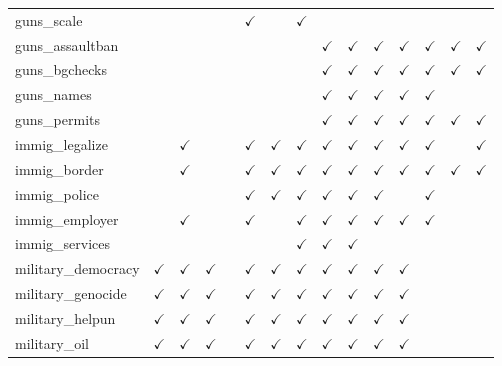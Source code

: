 \documentclass[12pt]{article}
\begin{document}
\begin{table}[H]
{\begin{tabular}{lcccccccccccccl}
guns\_scale &  &  &  &  & $\checkmark$ &  & $\checkmark$ &  &  &  &  &  &  & \\
guns\_assaultban &  &  &  &  &  &  &  & $\checkmark$ & $\checkmark$ & $\checkmark$ & $\checkmark$ & $\checkmark$ & $\checkmark$ & $\checkmark$\\
guns\_bgchecks &  &  &  &  &  &  &  & $\checkmark$ & $\checkmark$ & $\checkmark$ & $\checkmark$ & $\checkmark$ & $\checkmark$ & $\checkmark$\\
guns\_names &  &  &  &  &  &  &  & $\checkmark$ & $\checkmark$ & $\checkmark$ & $\checkmark$ & $\checkmark$ &  & \\
guns\_permits &  &  &  &  &  &  &  & $\checkmark$ & $\checkmark$ & $\checkmark$ & $\checkmark$ & $\checkmark$ & $\checkmark$ & $\checkmark$\\
immig\_legalize &  & $\checkmark$ &  &  & $\checkmark$ & $\checkmark$ & $\checkmark$ & $\checkmark$ & $\checkmark$ & $\checkmark$ & $\checkmark$ & $\checkmark$ &  & $\checkmark$\\
immig\_border &  & $\checkmark$ &  &  & $\checkmark$ & $\checkmark$ & $\checkmark$ & $\checkmark$ & $\checkmark$ & $\checkmark$ & $\checkmark$ & $\checkmark$ & $\checkmark$ & $\checkmark$\\
immig\_police &  &  &  &  & $\checkmark$ & $\checkmark$ & $\checkmark$ & $\checkmark$ & $\checkmark$ & $\checkmark$ &  & $\checkmark$ &  & \\
immig\_employer &  & $\checkmark$ &  &  & $\checkmark$ &  & $\checkmark$ & $\checkmark$ & $\checkmark$ & $\checkmark$ & $\checkmark$ & $\checkmark$ &  & \\
immig\_services &  &  &  &  &  &  & $\checkmark$ & $\checkmark$ & $\checkmark$ &  &  &  &  & \\
military\_democracy & $\checkmark$ & $\checkmark$ & $\checkmark$ &  & $\checkmark$ & $\checkmark$ & $\checkmark$ & $\checkmark$ & $\checkmark$ & $\checkmark$ & $\checkmark$ &  &  & \\
military\_genocide & $\checkmark$ & $\checkmark$ & $\checkmark$ &  & $\checkmark$ & $\checkmark$ & $\checkmark$ & $\checkmark$ & $\checkmark$ & $\checkmark$ & $\checkmark$ &  &  & \\
military\_helpun & $\checkmark$ & $\checkmark$ & $\checkmark$ &  & $\checkmark$ & $\checkmark$ & $\checkmark$ & $\checkmark$ & $\checkmark$ & $\checkmark$ & $\checkmark$ &  &  & \\
military\_oil & $\checkmark$ & $\checkmark$ & $\checkmark$ &  & $\checkmark$ & $\checkmark$ & $\checkmark$ & $\checkmark$ & $\checkmark$ & $\checkmark$ & $\checkmark$ &  &  & \\

\end{tabular}}
\end{table}
\end{document}
